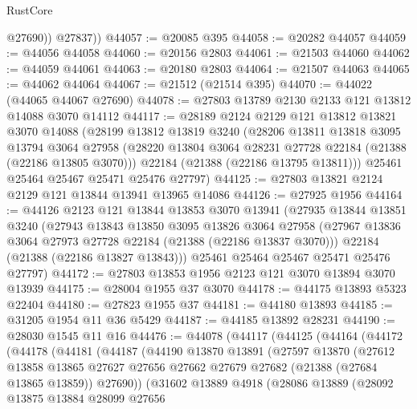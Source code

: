 \begin{lexlean}{RustCore}
\begin{coremodule}
            @27690))
        @27837))
@44057 := @20085 @395
@44058 := @20282 @44057
@44059 := @44056 @44058
@44060 := @20156 @2803
@44061 := @21503 @44060
@44062 := @44059 @44061
@44063 := @20180 @2803
@44064 := @21507 @44063
@44065 := @44062 @44064
@44067 := @21512 (@21514 @395)
@44070 := @44022 (@44065 @44067 @27690)
@44078 := @27803 @13789 @2130 @2133 @121 @13812 @14088 @3070 @14112
@44117 := @28189
    @2124
    @2129
    @121
    @13812
    @13821
    @3070
    @14088
    (@28199
      @13812
      @13819
      @3240
      (@28206
        @13811
        @13818
        @3095
        @13794
        @3064
        @27958
        (@28220 @13804 @3064 @28231 @27728 @22184 (@21388 (@22186 @13805 @3070)))
        @22184
        (@21388 (@22186 @13795 @13811)))
      @25461
      @25464
      @25467
      @25471
      @25476
      @27797)
@44125 := @27803 @13821 @2124 @2129 @121 @13844 @13941 @13965 @14086
@44126 := @27925 @1956
@44164 := @44126
    @2123
    @121
    @13844
    @13853
    @3070
    @13941
    (@27935
      @13844
      @13851
      @3240
      (@27943
        @13843
        @13850
        @3095
        @13826
        @3064
        @27958
        (@27967 @13836 @3064 @27973 @27728 @22184 (@21388 (@22186 @13837 @3070)))
        @22184
        (@21388 (@22186 @13827 @13843)))
      @25461
      @25464
      @25467
      @25471
      @25476
      @27797)
@44172 := @27803 @13853 @1956 @2123 @121 @3070 @13894 @3070 @13939
@44175 := @28004 @1955 @37 @3070
@44178 := @44175 @13893 @5323 @22404
@44180 := @27823 @1955 @37
@44181 := @44180 @13893
@44185 := @31205 @1954 @11 @36 @5429
@44187 := @44185 @13892 @28231
@44190 := @28030 @1545 @11 @16
@44476 := @44078
    (@44117
      (@44125
        (@44164
          (@44172
            (@44178
              (@44181
                (@44187
                  (@44190
                    @13870
                    @13891
                    (@27597
                      @13870
                      (@27612
                        @13858
                        @13865
                        @27627
                        @27656
                        @27662
                        @27679
                        @27682
                        (@21388 (@27684 @13865 @13859))
                        @27690))
                    (@31602
                      @13889
                      @4918
                      (@28086
                        @13889
                        (@28092
                          @13875
                          @13884
                          @28099
                          @27656

\end{coremodule}
\end{lexlean}

